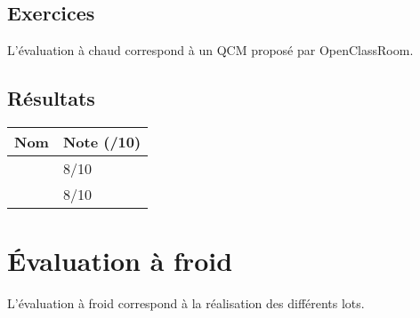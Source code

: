 \documentclass[asi, sansVersion]{picInsa}
\begin{document}
		\subsection*{Exercices}
		L'évaluation à chaud correspond à un QCM proposé par OpenClassRoom.

			
		\subsection*{Résultats}
			\begin{longtable}{|p{0.5\textwidth}|p{}|}
				\hline
					\rowcolor[gray]{0.90} Nom & Note (/10) \\
				\hline
					\Francois &  8/10\\
				\hline
					\Juliana &  8/10\\
					
				\hline
			
			\end{longtable}
			
	\newpage
	\section*{Évaluation à froid}
		L'évaluation à froid correspond à la réalisation des différents lots.
\end{document}
